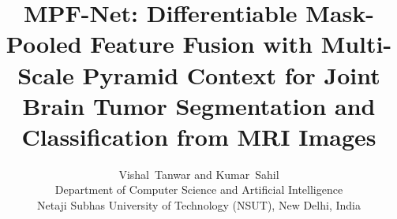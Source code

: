 \documentclass[journal]{IEEEtran}
\begin{document}
\title{MPF-Net: Differentiable Mask-Pooled Feature Fusion with Multi-Scale
  Pyramid Context for Joint Brain Tumor Segmentation and Classification
  from MRI Images}

\author{Vishal~Tanwar and Kumar~Sahil\\[0.6ex]
  \normalsize Department of Computer Science and Artificial Intelligence\\
  \normalsize Netaji Subhas University of Technology (NSUT), New Delhi, India}

\markboth{}{}%

\maketitle
\end{document}
